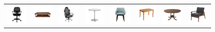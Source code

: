 \begin{figure}[t]
\centering
\setlength{\tabcolsep}{0pt}
\begin{tabular}{cccccccc}
    
\includegraphics[width=.12\linewidth]{rendering/real_MRI2PC/out_0000.png} &
\includegraphics[width=.12\linewidth]{rendering/real_MRI2PC/tables/table8_mrt.png} &
\includegraphics[width=.12\linewidth]{rendering/real_MRI2PC/out_0002.png} &
\includegraphics[width=.12\linewidth]{rendering/real_MRI2PC/tables/table2_mrt.png} &
\includegraphics[width=.12\linewidth]{rendering/real_MRI2PC/out_0004.png} &
\includegraphics[width=.12\linewidth]{rendering/real_MRI2PC/tables/table3_mrt.png} &
\includegraphics[width=.12\linewidth]{rendering/real_MRI2PC/tables/table5_mrt.png} &
\includegraphics[width=.12\linewidth]{rendering/real_MRI2PC/out_0007.png} \\


\end{tabular}
\end{figure}
